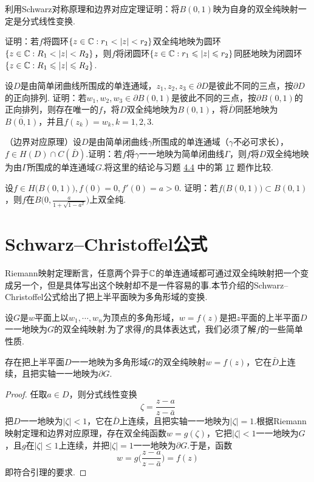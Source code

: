 \begin{xiti}\hypertarget{xiti7.3}{}
  \item 利用Schwarz对称原理和边界对应定理证明：将$B(0,1)$映为自身的双全纯映射一定是分式线性变换.
  \item \hypertarget{xiti7.3.2}{} 证明：若$f$将圆环$\{z\in\MC:r_1<|z|<r_2\}$双全纯地映为圆环
        $\{z\in\MC:R_1<|z|<R_2\}$，则$f$将闭圆环$\{z\in\mathbb C:r_1\leqslant|z|\leqslant r_2\}$同胚地映为闭圆环$\{z\in\mathbb C:R_1\leqslant|z|\leqslant R_2\}$.
  \item 设$D$是由简单闭曲线所围成的单连通域，$z_1,z_2,z_3\in\partial D$是彼此不同的三点，按$\partial D$的正向排列. 证明：若$w_1,w_2,w_3\in\partial B(0,1)$是彼此不同的三点，按$\partial B(0,1)$的正向排列，则存在唯一的$f$，将$D$双全纯地映为$B(0,1)$，将$\bar D$同胚地映为$\bar{B(0,1)}$，并且$f(z_k)=w_k,k=1,2,3$.
  \item （边界对应原理）设$D$是由简单闭曲线$\gamma$所围成的单连通域（$\gamma$不必可求长），$f\in H(D)\cap C(\bar D)$.证明：若$f$将$\gamma$一一地映为简单闭曲线$\Gamma$，则$f$将$D$双全纯地映为由$\Gamma$所围成的单连通域$G$.将这里的结论与习题 \hyperlink{xiti4.4}{4.4} 中的第
      \hyperlink{xiti4.4.17}{17} 题作比较.
  \item 设$f\in H\big(B(0,1)\big),f(0)=0,f'(0)=a>0$. 证明：若$f\big(B(0,1)\big)\subset B(0,1)$，则$f$在$B\bigg(0,\frac a{1+\sqrt{1-a^2}}\bigg)$上双全纯.
\end{xiti}

\section{Schwarz--Christoffel公式\label{sec7.4}}
Riemann映射定理断言，任意两个异于$\mathbb C$的单连通域都可通过双全纯映射把一个变成另一个，但是具体写出这个映射却不是一件容易的事.本节介绍的Schwarz--Christoffel公式给出了把上半平面映为多角形域的变换.

设$G$是$w$平面上以$w_1,\cdots,w_n$为顶点的多角形域，$w=f(z)$是把$z$平面的上半平面$D$一一地映为$G$的双全纯映射.为了求得$f$的具体表达式，我们必须了解$f$的一些简单性质.
\begin{lemma}\label{lemma7.4.1}
  存在把上半平面$D$一一地映为多角形域$G$的双全纯映射$w=f(z)$，它在$\bar D$上连续，且把实轴一一地映为$ \partial G$.
\end{lemma}
\begin{proof}
  任取$a\in D$，则分式线性变换
  \[
    \zeta = \frac{z-a}{z-\bar a}
  \]
  把$D$一一地映为$|\zeta|<1$，它在$\bar D$上连续，且把实轴一一地映为$|\zeta|=1$.根据Riemann映射定理和边界对应原理，存在双全纯函数$w=g(\zeta)$，它把$|\zeta|<1$一一地映为$G$，且$g$在$|\zeta|\le1$上连续，并把$|\zeta|=1$一一地映为$\partial G$.于是，函数
  \[
    w = g\bigg(\frac{z-a}{z-\bar a}\bigg) = f(z)
  \]
  即符合引理的要求.
\end{proof}

